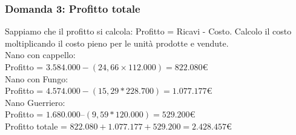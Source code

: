 \documentclass{article}
\begin{document}
\subsubsection{Domanda 3: Profitto totale}
Sappiamo che il profitto si calcola: Profitto = Ricavi - Costo. Calcolo il costo moltiplicando il costo pieno per le unità prodotte e vendute.
\vspace*{0.2cm}\\
Nano con cappello:\\
Profitto = $ 3.584.000 - (24,66 \times 112.000) = 822.080$\euro 
\vspace*{0.1cm}\\
Nano con Fungo:\\
Profitto = $4.574.000 - (15,29 * 228.700)= 1.077.177$\euro 
\vspace*{0.2cm}\\
Nano Guerriero:\\
Profitto = $1.680.000 – (9,59 * 120.000) = 529.200$\euro 
\vspace*{0.2cm}\\
Profitto totale = $ 822.080 + 1.077.177 + 529.200 = 2.428.457$\euro   
\end{document}
